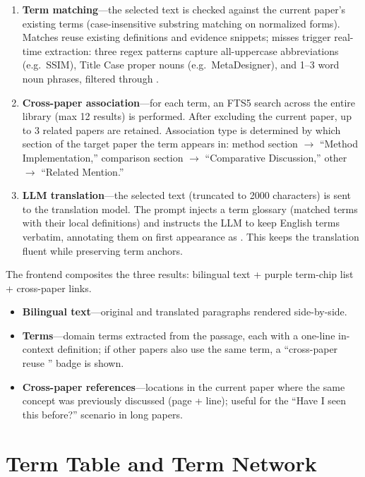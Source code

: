 \begin{enumerate}
  \item \textbf{Term matching}---the selected text is checked against the current
    paper's existing terms (case-insensitive substring matching on normalized forms).
    Matches reuse existing definitions and evidence snippets; misses trigger real-time
    extraction: three regex patterns capture all-uppercase abbreviations (e.g.\ SSIM),
    Title Case proper nouns (e.g.\ MetaDesigner), and 1--3 word noun phrases, filtered
    through .
  \item \textbf{Cross-paper association}---for each term, an FTS5 search across the
    entire library (max 12 results) is performed. After excluding the current paper,
    up to 3 related papers are retained. Association type is determined by which section
    of the target paper the term appears in: method section $\to$ ``Method
    Implementation,'' comparison section $\to$ ``Comparative Discussion,'' other
    $\to$ ``Related Mention.''
  \item \textbf{LLM translation}---the selected text (truncated to 2000 characters) is
    sent to the translation model. The prompt injects a term glossary (matched terms
    with their local definitions) and instructs the LLM to keep English terms verbatim,
    annotating them on first appearance as . This keeps the
    translation fluent while preserving term anchors.
\end{enumerate}

The frontend composites the three results: bilingual text + purple term-chip list +
cross-paper links.
\begin{itemize}
  \item \textbf{Bilingual text}---original and translated paragraphs rendered
    side-by-side.
  \item \textbf{Terms}---domain terms extracted from the passage, each with a one-line
    in-context definition; if other papers also use the same term, a ``cross-paper
    reuse '' badge is shown.
  \item \textbf{Cross-paper references}---locations in the current paper where the same
    concept was previously discussed (page + line); useful for the ``Have I seen this
    before?'' scenario in long papers.
\end{itemize}

\section{Term Table and Term Network}


